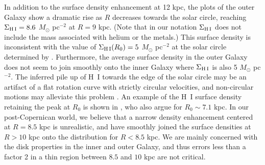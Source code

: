 \documentclass[12pt,preprint,flushrt]{aastex}
\begin{document}
In addition to the surface density enhancement at 12 kpc,
the \cite{wou90} plots of the outer Galaxy show a dramatic rise
as $R$ decreases towards the solar circle,
reaching $\Sigma_{\rm H\, I} = 8.6$ $M_\odot$ pc$^{-2}$
at $R=9$ kpc. (Note that in our notation $\Sigma_{\rm H\,I}$ does not
include the mass associated with helium or the metals.)
This surface density is inconsistent with the value
of $\Sigma_{\rm H\,I}(R_0)=5$
$M_\odot$ pc$^{-2}$ at the solar circle determined by
\cite{dic90}. Furthermore, the average  surface density in the
outer Galaxy does not seem to join smoothly onto the inner Galaxy
where $\Sigma_{\rm H\,I}$ is also  5 $M_\odot$ pc$^{-2}$.
The inferred pile up of H~I towards the edge of the solar circle may be an
artifact of a flat rotation curve with strictly circular velocities,
and non-circular motions may alleviate this problem \citep{blitz91}.
An example of the H~I surface density retaining the peak at $R_0$ is
shown in \cite{oll98}, who also argue for  $R_0 \sim 7.1$ kpc.
In our post-Copernican world, we believe that a narrow density
enhancement centered at $R = 8.5$ kpc is unrealistic, and have smoothly
joined the \cite{wou90} surface densities at $R > 10$ kpc onto
the distribution for $R < 8.5$ kpc.
We are mainly concerned with
the disk properties in the inner and outer Galaxy, and thus errors less
than a factor 2 in a thin region between $8.5$ and $10$ kpc are not critical.
\end{document}
